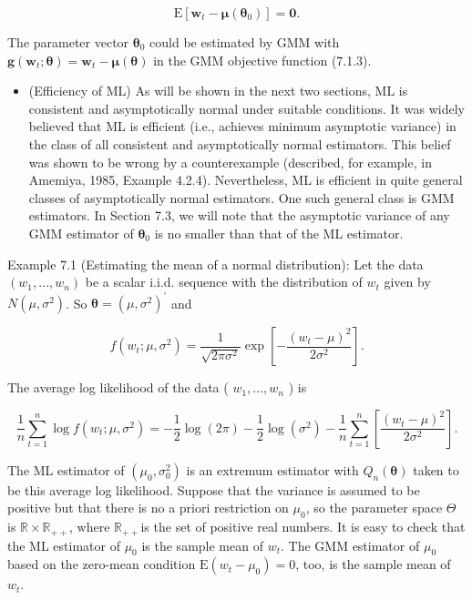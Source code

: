\documentclass[10pt]{article}
\begin{document}
\begin{equation*}
\mathrm{E}\left[\mathbf{w}_{t}-\boldsymbol{\mu}\left(\boldsymbol{\theta}_{0}\right)\right]=\mathbf{0} . \tag{7.1.7}
\end{equation*}


The parameter vector $\boldsymbol{\theta}_{0}$ could be estimated by GMM with $\mathbf{g}\left(\mathbf{w}_{t} ; \boldsymbol{\theta}\right)=\mathbf{w}_{t}-\boldsymbol{\mu}(\boldsymbol{\theta})$ in the GMM objective function (7.1.3).

\begin{itemize}
  \item (Efficiency of ML) As will be shown in the next two sections, ML is consistent and asymptotically normal under suitable conditions. It was widely believed that ML is efficient (i.e., achieves minimum asymptotic variance) in the class of all consistent and asymptotically normal estimators. This belief was shown to be wrong by a counterexample (described, for example, in Amemiya, 1985, Example 4.2.4). Nevertheless, ML is efficient in quite general classes of asymptotically normal estimators. One such general class is GMM estimators. In Section 7.3, we will note that the asymptotic variance of any GMM estimator of $\boldsymbol{\theta}_{0}$ is no smaller than that of the ML estimator.
\end{itemize}

Example 7.1 (Estimating the mean of a normal distribution): Let the data $\left(w_{1}, \ldots, w_{n}\right)$ be a scalar i.i.d. sequence with the distribution of $w_{t}$ given by $N\left(\mu, \sigma^{2}\right)$. So $\boldsymbol{\theta}=\left(\mu, \sigma^{2}\right)^{\prime}$ and

$$
f\left(w_{t} ; \mu, \sigma^{2}\right)=\frac{1}{\sqrt{2 \pi \sigma^{2}}} \exp \left[-\frac{\left(w_{t}-\mu\right)^{2}}{2 \sigma^{2}}\right] .
$$

The average log likelihood of the data ( $w_{1}, \ldots, w_{n}$ ) is


\begin{equation*}
\frac{1}{n} \sum_{t=1}^{n} \log f\left(w_{t} ; \mu, \sigma^{2}\right)=-\frac{1}{2} \log (2 \pi)-\frac{1}{2} \log \left(\sigma^{2}\right)-\frac{1}{n} \sum_{t=1}^{n}\left[\frac{\left(w_{t}-\mu\right)^{2}}{2 \sigma^{2}}\right] . \tag{7.1.8}
\end{equation*}


The ML estimator of $\left(\mu_{0}, \sigma_{0}^{2}\right)$ is an extremum estimator with $Q_{n}(\boldsymbol{\theta})$ taken to be this average log likelihood. Suppose that the variance is assumed to be positive but that there is no a priori restriction on $\mu_{0}$, so the parameter space $\Theta$ is $\mathbb{R} \times \mathbb{R}_{++}$, where $\mathbb{R}_{++}$is the set of positive real numbers. It is easy to check that the ML estimator of $\mu_{0}$ is the sample mean of $w_{t}$. The GMM estimator of $\mu_{0}$ based on the zero-mean condition $\mathrm{E}\left(w_{t}-\mu_{0}\right)=0$, too, is the sample mean of $w_{t}$.
\end{document}
